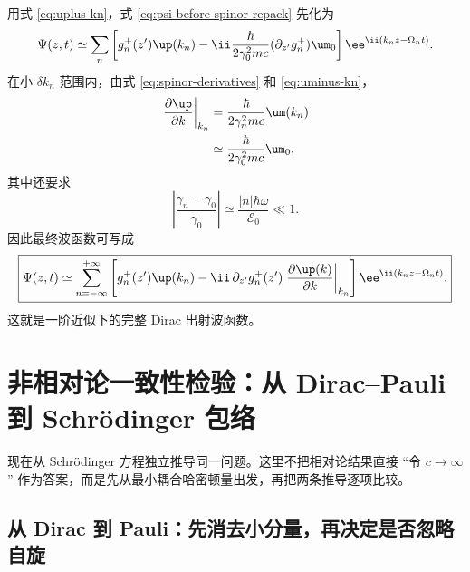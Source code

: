 用式 \eqref{eq:uplus-kn}，式 \eqref{eq:psi-before-spinor-repack} 先化为
\begin{align}
 \Psi(z,t)
 \simeq\sum_n\left[
 g_n^+(z')\up(k_n)
 -\ii\frac{\hbar}{2\gamma_0^2mc}
 (\partial_{z'}g_n^+)\um_0
 \right]
 \ee^{\ii(k_nz-\Omega_nt)}.
 \label{eq:psi-step1}
\end{align}
在小 $\delta k_n$ 范围内，由式 \eqref{eq:spinor-derivatives} 和 \eqref{eq:uminus-kn}，
\begin{align}
 \left.\frac{\partial\up}{\partial k}\right|_{k_n}
 &=\frac{\hbar}{2\gamma_n^2mc}\um(k_n)\\
 &\simeq\frac{\hbar}{2\gamma_0^2mc}\um_0,
 \label{eq:du-at-kn-approx}
\end{align}
其中还要求
\begin{equation}
 \boxed{
 \left|\frac{\gamma_n-\gamma_0}{\gamma_0}\right|
 \simeq\frac{|n|\hbar\omega}{\mathcal E_0}\ll1.}
 \label{eq:gamma-n-condition}
\end{equation}
因此最终波函数可写成
\begin{equation}
 \boxed{
 \Psi(z,t)\simeq
 \sum_{n=-\infty}^{+\infty}
 \left[
 g_n^+(z')\up(k_n)
 -\ii\,\partial_{z'}g_n^+(z')
 \left.\frac{\partial\up(k)}{\partial k}\right|_{k_n}
 \right]
 \ee^{\ii(k_nz-\Omega_nt)}.}
 \label{eq:final-dirac-wavefunction}
\end{equation}
这就是一阶近似下的完整 Dirac 出射波函数。




\section{非相对论一致性检验：从 Dirac--Pauli 到 Schr\"odinger 包络}

现在从 Schr\"odinger 方程独立推导同一问题。这里不把相对论结果直接 ``令 $c\to\infty$'' 作为答案，而是先从最小耦合哈密顿量出发，再把两条推导逐项比较。


\subsection{从 Dirac 到 Pauli：先消去小分量，再决定是否忽略自旋}


